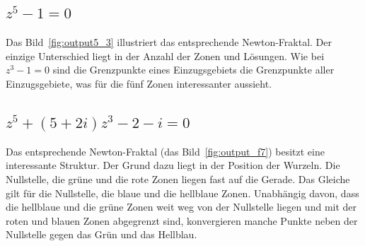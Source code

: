 \documentclass[a4paper,12pt]{llncs}
\numberwithin{equation}{section}
\begin{document}
\subsection{$z^5 -1 = 0$}
Das Bild~\ref{fig:output5_3} illustriert das entsprechende Newton-Fraktal. 
Der einzige Unterschied liegt in der Anzahl der Zonen und Lösungen.
Wie bei $z^3 -1 = 0$ sind die Grenzpunkte eines Einzugsgebiets die Grenzpunkte aller Einzugsgebiete, was für die fünf Zonen interessanter aussieht.

\subsection{$z^5 + (5+2i)z^3 - 2-i = 0$}
Das entsprechende Newton-Fraktal (das Bild~\ref{fig:output_f7}) besitzt eine interessante Struktur. 
Der Grund dazu liegt in der Position der Wurzeln.
Die Nullstelle, die grüne und die rote Zonen liegen fast auf die Gerade.
Das Gleiche gilt für die Nullstelle, die blaue und die hellblaue Zonen.
Unabhängig davon, dass die hellblaue und die grüne Zonen weit weg von der Nullstelle liegen und mit der roten und blauen Zonen abgegrenzt sind, konvergieren manche Punkte neben der Nullstelle gegen das Grün und das Hellblau.
\end{document}
